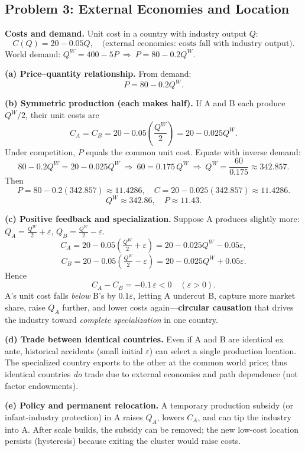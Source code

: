 \documentclass[12pt]{article}
\begin{document}
\bigskip

\subsection*{Problem 3: External Economies and Location }

\textbf{Costs and demand.} Unit cost in a country with industry output $Q$:
\[
C(Q)=20-0.05Q, \quad \text{(external economies: costs fall with industry output)}.
\]
World demand: $Q^W=400-5P \ \Rightarrow\ P=80-0.2Q^W$.

\medskip
\textbf{(a) Price--quantity relationship.} From demand:
\[
\boxed{P=80-0.2Q^W}.
\]

\medskip
\textbf{(b) Symmetric production (each makes half).} If A and B each produce $Q^W/2$, their unit costs are
\[
C_A=C_B=20-0.05\left(\frac{Q^W}{2}\right)=20-0.025Q^W.
\]
Under competition, $P$ equals the common unit cost. Equate with inverse demand:
\[
80-0.2Q^W = 20-0.025Q^W 
\ \Rightarrow\ 60=0.175\,Q^W \ \Rightarrow\ Q^W=\frac{60}{0.175}\approx 342.857.
\]
Then
\[
P=80-0.2(342.857)\approx 11.4286, \quad C=20-0.025(342.857)\approx 11.4286.
\]
\[
\boxed{Q^W\approx 342.86,\quad P\approx 11.43.}
\]

\medskip
\textbf{(c) Positive feedback and specialization.} Suppose A produces slightly more: $Q_A=\frac{Q^W}{2}+\varepsilon$, $Q_B=\frac{Q^W}{2}-\varepsilon$.
\[
C_A=20-0.05\!\left(\tfrac{Q^W}{2}+\varepsilon\right)=20-0.025Q^W-0.05\varepsilon,
\]
\[
C_B=20-0.05\!\left(\tfrac{Q^W}{2}-\varepsilon\right)=20-0.025Q^W+0.05\varepsilon.
\]
Hence
\[
C_A - C_B = -0.1\,\varepsilon < 0 \quad (\varepsilon>0).
\]
A's unit cost falls \emph{below} B's by $0.1\varepsilon$, letting A undercut B, capture more market share, raise $Q_A$ further, and lower costs again—\textbf{circular causation} that drives the industry toward \emph{complete specialization} in one country.

\medskip
\textbf{(d) Trade between identical countries.} Even if A and B are identical ex ante, historical accidents (small initial $\varepsilon$) can select a single production location. The specialized country exports to the other at the common world price; thus identical countries \emph{do} trade due to external economies and path dependence (not factor endowments).

\medskip
\textbf{(e) Policy and permanent relocation.} A temporary production subsidy (or infant-industry protection) in A raises $Q_A$, lowers $C_A$, and can tip the industry into A. After scale builds, the subsidy can be removed; the new low-cost location persists (hysteresis) because exiting the cluster would raise costs.
\end{document}
